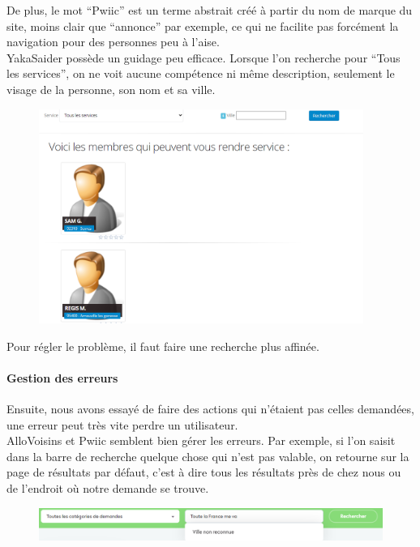 \documentclass[a4paper,11pt]{article}
\begin{document}
De plus, le mot “Pwiic” est un terme abstrait créé à partir du nom de marque du site, moins clair que “annonce”
par exemple, ce qui ne facilite pas forcément la navigation pour des personnes peu à l’aise.\\

YakaSaider possède un guidage peu efficace. Lorsque l’on recherche pour “Tous les services”, on ne voit aucune
compétence ni même description, seulement le visage de la personne, son nom et sa ville.\\

\begin{figure}[H]
  \includegraphics[width=400px]{images/guidage-yakasaider.png}
  \label{fig:guidage-yakasaider}
\end{figure}

Pour régler le problème, il faut faire une recherche plus affinée.\\

\paragraph{Gestion des erreurs}

Ensuite, nous avons essayé de faire des actions qui n’étaient pas celles demandées, une erreur peut très vite perdre un utilisateur.\\

AlloVoisins et Pwiic semblent bien gérer les erreurs. Par exemple, si l’on saisit dans la barre de recherche quelque chose
qui n’est pas valable, on retourne sur la page de résultats par défaut, c’est à dire tous les résultats près de
chez nous ou de l’endroit où notre demande se trouve.\\

\begin{figure}[H]
  \includegraphics[width=\linewidth]{images/gestion-erreur-allovoisins.png}
  \label{fig:gestion-erreur-allovoisins}
\end{figure}
\end{document}
